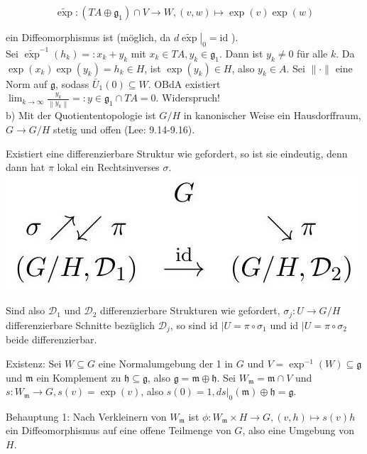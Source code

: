 \documentclass[10pt, letterpaper]{article}
\begin{document}
$$
\widetilde{\exp }:\left(T A \oplus \mathfrak{g}_{1}\right) \cap V \rightarrow W,(v, w) \mapsto \exp (v) \exp (w)
$$

ein Diffeomorphismus ist (möglich, da $\left.d \widetilde{\exp }\right|_{0}=\mathrm{id}$ ).\\
Sei $\widetilde{\exp }^{-1}\left(h_{k}\right)=: x_{k}+y_{k}$ mit $x_{k} \in T A, y_{k} \in \mathfrak{g}_{1}$. Dann ist $y_{k} \neq 0$ für alle $k$. Da $\exp \left(x_{k}\right) \exp \left(y_{k}\right)=h_{k} \in H$, ist $\exp \left(y_{k}\right) \in H$, also $y_{k} \in A$. Sei $\|\cdot\|$ eine Norm auf $\mathfrak{g}$, sodass $\bar{U}_{1}(0) \subseteq W$. OBdA existiert $\lim _{k \rightarrow \infty} \frac{y_{k}}{\left\|y_{k}\right\|}=: y \in \mathfrak{g}_{1} \cap T A=0$. Widerspruch!\\
b) Mit der Quotiententopologie ist $G / H$ in kanonischer Weise ein Hausdorffraum, $G \rightarrow G / H$ stetig und offen (Lee: 9.14-9.16).

Existiert eine differenzierbare Struktur wie gefordert, so ist sie eindeutig, denn dann hat $\pi$ lokal ein Rechtsinverses $\sigma$.\\
\includegraphics[max width=\textwidth, center]{2025_05_20_67e75debbfd3ba8ea587g-44}

Sind also $\mathcal{D}_{1}$ und $\mathcal{D}_{2}$ differenzierbare Strukturen wie gefordert, $\sigma_{j}: U \rightarrow G / H$ differenzierbare Schnitte bezüglich $\mathcal{D}_{j}$, so sind id $\mid U=\pi \circ \sigma_{1}$ und id $\mid U=\pi \circ \sigma_{2}$ beide differenzierbar.

Existenz: Sei $W \subseteq G$ eine Normalumgebung der 1 in $G$ und $V=\exp ^{-1}(W) \subseteq \mathfrak{g}$ und $\mathfrak{m}$ ein Komplement zu $\mathfrak{h} \subseteq \mathfrak{g}$, also $\mathfrak{g}=\mathfrak{m} \oplus \mathfrak{h}$. Sei $W_{\mathfrak{m}}=\mathfrak{m} \cap V$ und $s: W_{\mathfrak{m}} \rightarrow G, s(v)=\exp (v)$, also $s(0)=1,\left.d s\right|_{0}(\mathfrak{m}) \oplus \mathfrak{h}=\mathfrak{g}$.

Behauptung 1: Nach Verkleinern von $W_{\mathfrak{m}}$ ist $\phi: W_{\mathfrak{m}} \times H \rightarrow G,(v, h) \mapsto s(v) h$ ein Diffeomorphismus auf eine offene Teilmenge von $G$, also eine Umgebung von $H$.
\end{document}
